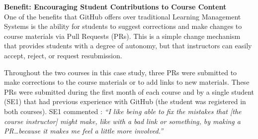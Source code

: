 

\textbf{Benefit: Encouraging Student Contributions to Course Content} \\
One of the benefits that GitHub offers over traditional Learning Management Systems is the ability for students to suggest corrections and make changes to course materials via Pull Requests (PRs). This is a simple change mechanism that provides students with a degree of autonomy, but that instructors can easily accept, reject, or request resubmission.

Throughout the two courses in this case study, three PRs were submitted to make corrections to the course materials or to add links to new materials. These PRs were submitted during the first month of each course and by a single student (SE1) that had previous experience with GitHub (the student was registered in both courses). SE1 commented : \textit{``I like being able to fix the mistakes that [the course instructor] might make, like with a bad link or something, by making a PR\ldots because it makes me feel a little more involved.''}

